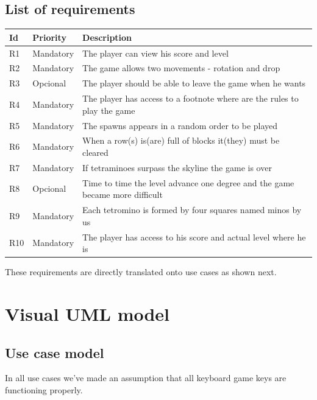 \documentclass[a4paper]{article}
\begin{document}
\subsection{List of requirements}
\label{sec:requirements}
\begin{table}[h]
	\centering
	\label{tab:list-of-requirements}
	\begin{tabular}{|l|l|p{9cm}|}
		\hline
		\textbf{Id} & \textbf{Priority} & \textbf{Description} \\ \hline
		R1 & Mandatory         & The player can view his score and level \\ \hline
		R2 & Mandatory         & The game allows two movements - rotation and drop \\ \hline
		R3 & Opcional         & The player should be able to leave the game when he wants \\ \hline
		R4 & Mandatory         & The player has access to a footnote where are the rules to play the game \\ \hline
		R5 & Mandatory         & The spawns appears in a random order to be played\\ \hline
		R6 & Mandatory         & When a row(s) is(are) full of blocks it(they) must be cleared \\ \hline
		R7 & Mandatory         & If tetraminoes surpass the skyline the game is over \\ \hline
		R8 & Opcional          & Time to time the level advance one degree and the game became more difficult \\ \hline
		R9 & Mandatory        & Each tetromino is formed by four squares named minos by us \\ \hline
		R10 & Mandatory        & The player has access to his score and actual level where he is \\ \hline
	\end{tabular}
\end{table}

These requirements are directly translated onto use cases as shown next.
\section{Visual UML model} 


\subsection{Use case model}

In all use cases we've made an assumption that all keyboard game keys are functioning properly.
\end{document}
